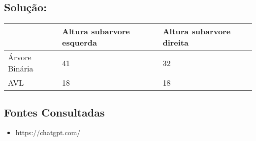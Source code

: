 \documentclass{article}
\begin{document}
\subsection*{Solução:}

\begin{tabularx}{\textwidth}{|X|X|X|} %
  \hline
   & Altura subarvore esquerda & Altura subarvore direita \\ \hline
   Árvore Binária & 41 & 32 \\ \hline
   AVL & 18 & 18 \\ \hline
\end{tabularx}

\subsection*{Fontes Consultadas}
\begin{itemize}
    \item https://chatgpt.com/
\end{itemize}
\end{document}
